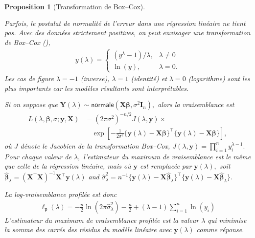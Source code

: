 \documentclass[
  11pt,
  letterpaper,
]{scrbook}
\theoremstyle{plain}
\newtheorem{proposition}{Proposition}[chapter]
\theoremstyle{plain}
\theoremstyle{definition}
\theoremstyle{definition}
\theoremstyle{remark}
\begin{document}
\begin{proposition}[Transformation de
Box--Cox]\protect\hypertarget{prp-boxcox}{}\label{prp-boxcox}

Parfois, le postulat de normalité de l'erreur dans une régression
linéaire ne tient pas. Avec des données strictement positives, on peut
envisager une transformation de Box--Cox
(), \begin{align*}
y(\lambda)= \begin{cases}
(y^{\lambda}-1)/\lambda, & \lambda \neq 0\\
\ln(y), & \lambda=0.
\end{cases}
\end{align*} Les cas de figure \(\lambda=-1\) (inverse), \(\lambda=1\)
(identité) et \(\lambda=0\) (logarithme) sont les plus importants car
les modèles résultants sont interprétables.

Si on suppose que
\(\boldsymbol{Y}(\lambda) \sim \mathsf{normale}(\mathbf{X}\boldsymbol{\beta}, \sigma^2 \mathbf{I}_n),\)
alors la vraisemblance est \begin{align*}
L(\lambda, \boldsymbol{\beta}, \sigma; \boldsymbol{y}, \mathbf{X}) &= (2\pi\sigma^2)^{-n/2} J(\lambda, \boldsymbol{y}) \times\\& \quad \exp \left[ - \frac{1}{2\sigma^2}\{\boldsymbol{y}(\lambda) - \mathbf{X}\boldsymbol{\beta}\}^\top\{\boldsymbol{y}(\lambda) - \mathbf{X}\boldsymbol{\beta}\}\right],
\end{align*} où \(J\) dénote le Jacobien de la transformation Box--Cox,
\(J(\lambda, \boldsymbol{y})=\prod_{i=1}^n y_i^{\lambda-1}.\) Pour
chaque valeur de \(\lambda,\) l'estimateur du maximum de vraisemblance
est le même que celle de la régression linéaire, mais où
\(\boldsymbol{y}\) est remplacée par \(\boldsymbol{y}(\lambda),\) soit
\(\widehat{\boldsymbol{\beta}}_\lambda = (\mathbf{X}^\top\mathbf{X})^{-1}\mathbf{X}^\top \boldsymbol{y}(\lambda)\)
and
\(\widehat{\sigma}^2_\lambda = n^{-1}\{ \boldsymbol{y}(\lambda) - \mathbf{X}\widehat{\boldsymbol{\beta}}_\lambda\}^\top\{ \boldsymbol{y}(\lambda) - \mathbf{X}\widehat{\boldsymbol{\beta}}_\lambda\}.\)

La log-vraisemblance profilée est donc \begin{align*}
\ell_{\mathsf{p}}(\lambda) = -\frac{n}{2}\ln(2\pi \widehat{\sigma}^2_\lambda) - \frac{n}{2} + (\lambda - 1)\sum_{i=1}^n \ln(y_i)
\end{align*} L'estimateur du maximum de vraisemblance profilée est la
valeur \(\lambda\) qui minimise la somme des carrés des résidus du
modèle linéaire avec \(\boldsymbol{y}(\lambda)\) comme réponse.


\end{proposition}
\end{document}
